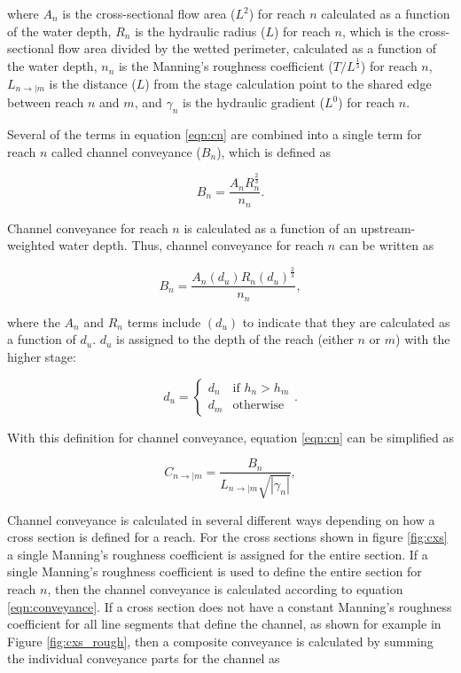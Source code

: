 \documentclass[fleqn]{article}
\begin{document}
\noindent where $A_n$ is the cross-sectional flow area ($L^2$) for reach $n$ calculated as a function of the water depth, $R_n$ is the hydraulic radius ($L$) for reach $n$, which is the cross-sectional flow area divided by the wetted perimeter, calculated as a function of the water depth, $n_n$ is the Manning's roughness coefficient ($T/L^{\frac{1}{3}}$) for reach $n$,  $L_{n \rightarrow | m}$ is the distance ($L$) from the stage calculation point to the shared edge between reach $n$ and $m$, and $\gamma_n$ is the hydraulic gradient ($L^0$) for reach $n$.

Several of the terms in equation \ref{eqn:cn} are combined into a single term for reach $n$ called channel conveyance ($B_n$), which is defined as

\begin{equation}
  B_n = \frac{A_n R_n^{\frac{2}{3}}}{n_n}.
\label{eqn:conveyance}
\end{equation}

\noindent Channel conveyance for reach $n$ is calculated as a function of an upstream-weighted water depth.  Thus, channel conveyance for reach $n$ can be written as

\begin{equation}
  B_n = \frac{A_n (d_u) R_n (d_u) ^{\frac{2}{3}}}{n_n},
\label{eqn:conveyancedu}
\end{equation}

\noindent where the $A_n$ and $R_n$ terms include $(d_u)$ to indicate that they are calculated as a function of $d_u$.  $d_u$ is assigned to the depth of the reach (either $n$ or $m$) with the higher stage:

\[
d_u = 
\begin{cases}
  d_n & \text{if $h_n>h_m$} \\
  d_m & \text{otherwise}
\end{cases}.
\]

With this definition for channel conveyance, equation \ref{eqn:cn} can be simplified as

\begin{equation}
  C_{n \rightarrow | m} = 
  \frac{
  B_n 
  }
  {
  L_{n \rightarrow | m}
  \sqrt{| \gamma_n |}
  },
\label{eqn:cn2}
\end{equation}

Channel conveyance is calculated in several different ways depending on how a cross section is defined for a reach.  For the cross sections shown in figure \ref{fig:cxs} a single Manning's roughness coefficient is assigned for the entire section.  If a single Manning's roughness coefficient is used to define the entire section for reach $n$, then the channel conveyance is calculated according to equation \ref{eqn:conveyance}.  If a cross section does not have a constant Manning's roughness coefficient for all line segments that define the channel, as shown for example in Figure \ref{fig:cxs_rough}, then a composite conveyance is calculated by summing the individual conveyance parts for the channel as
\end{document}
